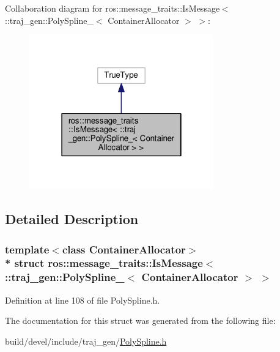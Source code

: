 Collaboration diagram for ros\+:\+:message\+\_\+traits\+:\+:Is\+Message$<$ \+:\+:traj\+\_\+gen\+:\+:Poly\+Spline\+\_\+$<$ Container\+Allocator $>$ $>$\+:
\nopagebreak
\begin{figure}[H]
\begin{center}
\leavevmode
\includegraphics[width=226pt]{structros_1_1message__traits_1_1_is_message_3_01_1_1traj__gen_1_1_poly_spline___3_01_container_allocator_01_4_01_4__coll__graph}
\end{center}
\end{figure}


\subsection{Detailed Description}
\subsubsection*{template$<$class Container\+Allocator$>$\\*
struct ros\+::message\+\_\+traits\+::\+Is\+Message$<$ \+::traj\+\_\+gen\+::\+Poly\+Spline\+\_\+$<$ Container\+Allocator $>$ $>$}



Definition at line 108 of file Poly\+Spline.\+h.



The documentation for this struct was generated from the following file\+:\begin{DoxyCompactItemize}
\item 
build/devel/include/traj\+\_\+gen/\hyperlink{_poly_spline_8h}{Poly\+Spline.\+h}\end{DoxyCompactItemize}
